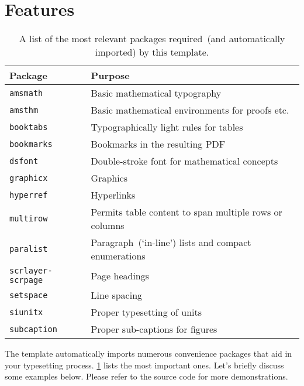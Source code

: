 \section{Features}

\begin{table}
  \centering
  \caption{%
  	A list of the most relevant packages required~(and automatically imported) by this template.
  }
  \label{tab:Packages}
  \begin{tabular}{ll}
    \toprule
    \textbf{Package}      & \textbf{Purpose}\\
    \midrule
      \texttt{amsmath}          & Basic mathematical typography\\
      \texttt{amsthm}           & Basic mathematical environments for proofs etc.\\
      \texttt{booktabs}         & Typographically light rules for tables\\
      \texttt{bookmarks}        & Bookmarks in the resulting PDF\\
      \texttt{dsfont}           & Double-stroke font for mathematical concepts\\
      \texttt{graphicx}         & Graphics\\
      \texttt{hyperref}         & Hyperlinks\\
      \texttt{multirow}         & Permits table content to span multiple rows or columns\\ 
      \texttt{paralist}         & Paragraph~(`in-line') lists and compact enumerations\\
      \texttt{scrlayer-scrpage} & Page headings\\
      \texttt{setspace}         & Line spacing\\
      \texttt{siunitx}          & Proper typesetting of units\\
      \texttt{subcaption} & Proper sub-captions for figures\\
    \bottomrule
  \end{tabular}
\end{table}

The template automatically imports numerous convenience packages that
aid in your typesetting process. \cref{tab:Packages} lists the
most important ones. Let's briefly discuss some examples below. Please
refer to the source code for more demonstrations.

